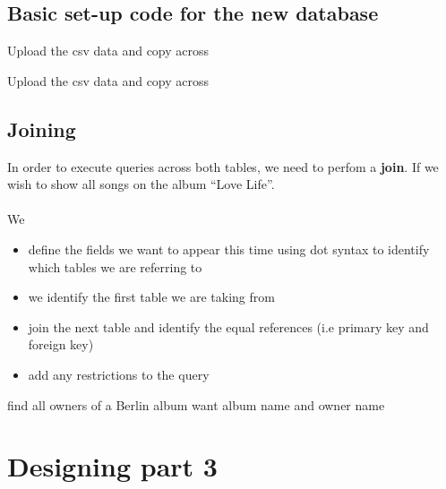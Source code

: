 \documentclass[a4paper,12pt]{article}
\begin{document}
\subsection{Basic set-up code for the new database}


Upload the csv data and copy across







Upload the csv data and copy across






\subsection{Joining}
In order to execute queries across both tables, we need to perfom a \textbf{join}.
If we wish to show all songs on the album ``Love Life''.\\\\
We
\begin{itemize}
	\item define the fields we want to appear this time using dot syntax to identify which tables we are referring to
	\item we identify the first table we are taking from
	\item join the next table and identify the equal references (i.e primary key and foreign key)
	\item add any restrictions to the query
\end{itemize}

\newpage
find all owners of a Berlin album
want album name  and owner name
 \section{Designing part 3}
\end{document}
